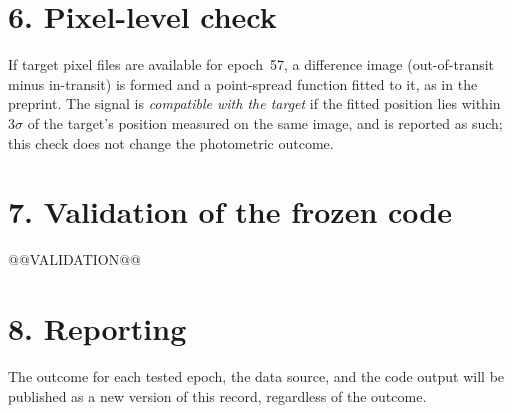 \documentclass[11pt]{article}
\begin{document}
\section*{6. Pixel-level check}
If target pixel files are available for epoch~57, a difference image (out-of-transit minus in-transit) is formed and a point-spread function fitted to it, as in the preprint. The signal is \emph{compatible with the target} if the fitted position lies within $3\sigma$ of the target's position measured on the same image, and is reported as such; this check does not change the photometric outcome.

\section*{7. Validation of the frozen code}
@@VALIDATION@@

\section*{8. Reporting}
The outcome for each tested epoch, the data source, and the code output will be published as a new version of this record, regardless of the outcome.
\end{document}
